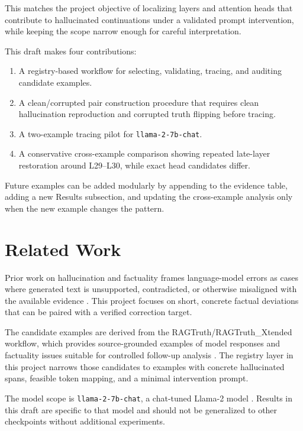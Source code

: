 \documentclass[11pt]{article}
\begin{document}
This matches the project objective of localizing layers and attention heads that contribute to hallucinated continuations under a validated prompt intervention, while keeping the scope narrow enough for careful interpretation.

This draft makes four contributions:
\begin{enumerate}
    \item A registry-based workflow for selecting, validating, tracing, and auditing candidate examples.
    \item A clean/corrupted pair construction procedure that requires clean hallucination reproduction and corrupted truth flipping before tracing.
    \item A two-example tracing pilot for \texttt{llama-2-7b-chat}.
    \item A conservative cross-example comparison showing repeated late-layer restoration around L29--L30, while exact head candidates differ.
\end{enumerate}

Future examples can be added modularly by appending to the evidence table, adding a new Results subsection, and updating the cross-example analysis only when the new example changes the pattern.

\section{Related Work}

Prior work on hallucination and factuality frames language-model errors as cases where generated text is unsupported, contradicted, or otherwise misaligned with the available evidence \citep{TruthfulQA,SelfCheckGPT}. This project focuses on short, concrete factual deviations that can be paired with a verified correction target.

The candidate examples are derived from the RAGTruth/RAGTruth\_Xtended workflow, which provides source-grounded examples of model responses and factuality issues suitable for controlled follow-up analysis \citep{RAGTruth,RAGTruthXtended}. The registry layer in this project narrows those candidates to examples with concrete hallucinated spans, feasible token mapping, and a minimal intervention prompt.

The model scope is \texttt{llama-2-7b-chat}, a chat-tuned Llama-2 model \citep{Llama2}. Results in this draft are specific to that model and should not be generalized to other checkpoints without additional experiments.
\end{document}
